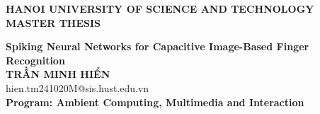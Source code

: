 \documentclass[Main.tex]{subfiles}
\begin{document}
\begin{titlepage}
\thispagestyle{empty}
\begin{center}

{\textbf{\large{HANOI UNIVERSITY OF SCIENCE AND TECHNOLOGY }}}\\[4cm]

{\textbf{\huge{MASTER THESIS}}}\\[1cm]
{\textbf{\Large{Spiking Neural Networks for Capacitive Image-Based Finger Recognition}}\\[1cm]

{\textbf{\large{TRẦN MINH HIỂN}}}\\
{\large{hien.tm241020M@sis.hust.edu.vn}}\\[0.5cm]

{\textbf{\large{Program: Ambient Computing, Multimedia and Interaction}}}\\

\vspace{4cm}
\begin{table}[H]
\centering
{}
\end{table}}
\end{center}



\end{titlepage}
\end{document}
